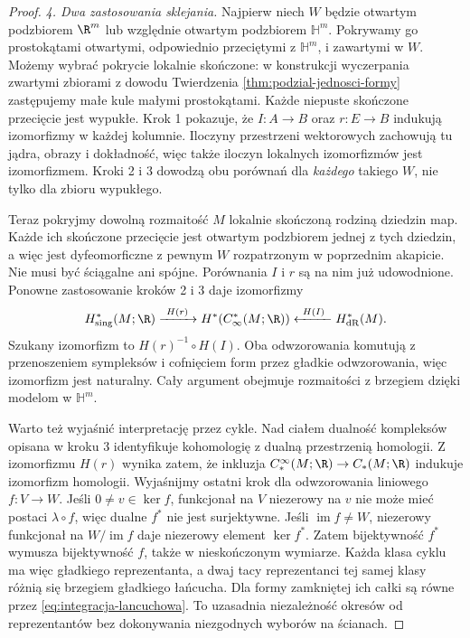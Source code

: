 \begin{proof}
\emph{4. Dwa zastosowania sklejania.}
Najpierw niech $W$ będzie otwartym podzbiorem $\R^m$
lub względnie otwartym podzbiorem $\mathbb H^m$.
Pokrywamy go prostokątami otwartymi, odpowiednio
przeciętymi z $\mathbb H^m$, i zawartymi w $W$.
Możemy wybrać pokrycie lokalnie skończone: w konstrukcji
wyczerpania zwartymi zbiorami z dowodu Twierdzenia
\ref{thm:podzial-jednosci-formy} zastępujemy małe kule
małymi prostokątami. Każde niepuste skończone przecięcie
jest wypukłe. Krok 1 pokazuje, że $I:A\to B$ oraz
$r:E\to B$ indukują izomorfizmy w każdej kolumnie.
Iloczyny przestrzeni wektorowych zachowują tu jądra,
obrazy i dokładność, więc także iloczyn lokalnych
izomorfizmów jest izomorfizmem. Kroki 2 i 3 dowodzą
obu porównań dla \emph{każdego} takiego $W$, nie tylko
dla zbioru wypukłego.

Teraz pokryjmy dowolną rozmaitość $M$ lokalnie skończoną
rodziną dziedzin map. Każde ich skończone przecięcie
jest otwartym podzbiorem jednej z tych dziedzin,
a więc jest dyfeomorficzne z pewnym $W$ rozpatrzonym
w poprzednim akapicie. Nie musi być ściągalne ani spójne.
Porównania $I$ i $r$ są na nim już udowodnione.
Ponowne zastosowanie kroków 2 i 3 daje izomorfizmy
\[
 H^*_{\mathrm{sing}}(M;\R)
 \xrightarrow{\ H(r)\ }H^*(C_\infty^*(M;\R))
 \xleftarrow{\ H(I)\ }H^*_{\mathrm{dR}}(M).
\]
Szukany izomorfizm to $H(r)^{-1}\circ H(I)$.
Oba odwzorowania komutują z przenoszeniem sympleksów
i cofnięciem form przez gładkie odwzorowania, więc
izomorfizm jest naturalny. Cały argument obejmuje
rozmaitości z brzegiem dzięki modelom w $\mathbb H^m$.

Warto też wyjaśnić interpretację przez cykle. Nad ciałem
dualność kompleksów opisana w kroku 3 identyfikuje
kohomologię z dualną przestrzenią homologii.
Z izomorfizmu $H(r)$ wynika zatem, że inkluzja
$C_*^\infty(M;\R)\to C_*(M;\R)$ indukuje izomorfizm
homologii. Wyjaśnijmy ostatni krok dla odwzorowania
liniowego $f:V\to W$. Jeśli $0\ne v\in\ker f$,
funkcjonał na $V$ niezerowy na $v$ nie może mieć
postaci $\lambda\circ f$, więc dualne $f^*$ nie jest
surjektywne. Jeśli $\operatorname{im}f\ne W$,
niezerowy funkcjonał na $W/\operatorname{im}f$ daje
niezerowy element $\ker f^*$. Zatem bijektywność
$f^*$ wymusza bijektywność $f$, także w nieskończonym wymiarze.
Każda klasa cyklu ma więc gładkiego reprezentanta,
a dwaj tacy reprezentanci tej samej klasy różnią się
brzegiem gładkiego łańcucha. Dla formy zamkniętej ich
całki są równe przez \eqref{eq:integracja-lancuchowa}.
To uzasadnia niezależność okresów od reprezentantów
bez dokonywania niezgodnych wyborów na ścianach.
\end{proof}

